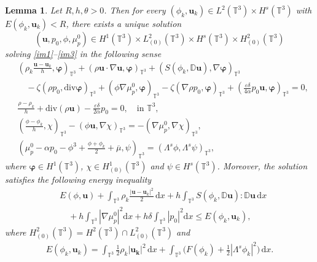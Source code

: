 \documentclass[reqno,a4paper,11pt]{amsart}
\theoremstyle{plain}
\newtheorem{lemma}[theorem]{Lemma}
\numberwithin{equation}{section}
\begin{document}
\begin{lemma}\label{im-energy}
	Let $R,h,\theta>0$. Then for every $(\phi_{k}, \mathbf{u}_{k})\in L^{2}(\mathbb{T}^{3})\times H^{s}(\mathbb{T}^{3})$ with $E(\phi_{k}, \mathbf{u}_{k})<R$, there exists a unique solution
	$$(\mathbf{u},p_{0},\phi,\mu_{p}^{0})\in H^{1}(\mathbb{T}^{3})\times L^{2}_{(0)}(\mathbb{T}^{3})\times H^{s}(\mathbb{T}^{3})\times H^{2}_{(0)}(\mathbb{T}^{3})$$
	solving \eqref{im1}--\eqref{im3} in the following sense
	\begin{align}\label{im1-w}
		&\nonumber(\rho_{k}\frac{\mathbf{u}-\mathbf{u}_{k}}{h},\boldsymbol{\varphi})_{\mathbb{T}^{3}}+(\rho\mathbf{u}\cdot\nabla\mathbf{u},\boldsymbol{\varphi})_{\mathbb{T}^{3}}+(S(\phi_{k},\mathbb{ D}\mathbf{u}),\nabla\boldsymbol{\varphi})_{\mathbb{T}^{3}}
		\\&\quad-\zeta(\rho p_{0},\mathrm{div}\boldsymbol{\varphi})_{\mathbb{T}^{3}}+(\phi \nabla \mu_{p}^{0},\boldsymbol{\varphi})_{\mathbb{T}^{3}}-\zeta(\nabla\rho p_{0},\boldsymbol{\varphi})_{\mathbb{T}^{3}}
		+(\frac{\varepsilon\delta}{4\alpha}p_{0} \mathbf{u},\boldsymbol{\varphi})_{\mathbb{T}^{3}}=0,\\
		\label{im2-w}
		&\frac{\rho-\rho_{k}}{h}+\mathrm{div} (\rho \mathbf{u})-\frac{\varepsilon\delta}{2\alpha} p_{0}=0, \quad\text{in $\mathbb{T}^{3}$,}
		\\  \label{im2-1-w}&(\frac{\phi-\phi_{k}}{h},\chi)_{\mathbb{T}^{3}}-(\phi\mathbf{u},\nabla\chi)_{\mathbb{T}^{3}}= -(\nabla \mu_{p}^{0},\nabla\chi)_{\mathbb{T}^{3}},\\
		\label{im3-w}
		&(\mu_{p}^{0}-\alpha p_{0}-\phi^3+\frac{\phi+\phi_{k}}{2}+\overline{\mu},\psi)_{\mathbb{T}^{3}}=(\Lambda^{s}\phi,\Lambda^{s}\psi)_{\mathbb{T}^{3}},
	\end{align}
	where  $\boldsymbol{\varphi}\in H^{1}(\mathbb{T}^{3})$, $\chi\in H_{(0)}^{1}(\mathbb{T}^{3})$ and $\psi\in H^{s}(\mathbb{T}^{3})$. Moreover, the solution satisfies  the following energy inequality
	\begin{align}\label{imes}
		&\nonumber E(\phi, \mathbf{u}) + \int_{\mathbb{T}^{3}} \rho_{k}\frac{|\mathbf{u}-\mathbf{u}_{k}|^{2}}{2}\,\mathrm dx +h\int_{\mathbb{T}^{3}}S(\phi_{k},\mathbb{ D}\mathbf{u}):\mathbb{ D}\mathbf{u}\,\mathrm dx
		\\&\quad+h\int_{\mathbb{T}^{3}}|\nabla \mu_{p}^{0}|^{2}\mathrm dx+h\delta\int_{\mathbb{T}^{3}}|{p}_{0}|^{2}\mathrm dx\leq E(\phi_{k}, \mathbf{u}_{k}),
	\end{align}
	where $H_{(0)}^{2}(\mathbb{T}^{3})=H^{2}(\mathbb{T}^{3})\cap L^{2}_{(0)}(\mathbb{T}^{3})$ and
	\begin{align*}%
		E(\phi_{k}, \mathbf{u}_{k})=
		\int_{\mathbb{T}^{3}}\frac{1}{2}\rho_k|\mathbf{u_k}|^2\, \mathrm{d} x+
		\int_{\mathbb{T}^{3}}\Big( F(\phi_k)+\frac{1}{2}|\Lambda^{s} \phi_k|^2\Big)\, \mathrm dx.
	\end{align*}
	
	
	
\end{lemma}
\end{document}
